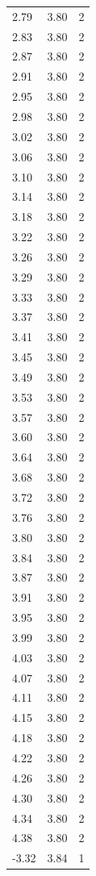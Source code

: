 \begin{longtable}{lrr}
  2.79 & 3.80 & 2 \\
  2.83 & 3.80 & 2 \\
  2.87 & 3.80 & 2 \\
  2.91 & 3.80 & 2 \\
  2.95 & 3.80 & 2 \\
  2.98 & 3.80 & 2 \\
  3.02 & 3.80 & 2 \\
  3.06 & 3.80 & 2 \\
  3.10 & 3.80 & 2 \\
  3.14 & 3.80 & 2 \\
  3.18 & 3.80 & 2 \\
  3.22 & 3.80 & 2 \\
  3.26 & 3.80 & 2 \\
  3.29 & 3.80 & 2 \\
  3.33 & 3.80 & 2 \\
  3.37 & 3.80 & 2 \\
  3.41 & 3.80 & 2 \\
  3.45 & 3.80 & 2 \\
  3.49 & 3.80 & 2 \\
  3.53 & 3.80 & 2 \\
  3.57 & 3.80 & 2 \\
  3.60 & 3.80 & 2 \\
  3.64 & 3.80 & 2 \\
  3.68 & 3.80 & 2 \\
  3.72 & 3.80 & 2 \\
  3.76 & 3.80 & 2 \\
  3.80 & 3.80 & 2 \\
  3.84 & 3.80 & 2 \\
  3.87 & 3.80 & 2 \\
  3.91 & 3.80 & 2 \\
  3.95 & 3.80 & 2 \\
  3.99 & 3.80 & 2 \\
  4.03 & 3.80 & 2 \\
  4.07 & 3.80 & 2 \\
  4.11 & 3.80 & 2 \\
  4.15 & 3.80 & 2 \\
  4.18 & 3.80 & 2 \\
  4.22 & 3.80 & 2 \\
  4.26 & 3.80 & 2 \\
  4.30 & 3.80 & 2 \\
  4.34 & 3.80 & 2 \\
  4.38 & 3.80 & 2 \\
  -3.32 & 3.84 & 1 \\

\end{longtable}

